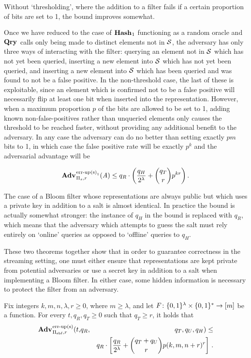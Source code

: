 Without `thresholding', where the addition to a filter fails if a certain proportion of bits are set to 1, the bound improves somewhat.

Once we have reduced to the case of $\mathbf{Hash}\hspace{0.5pt}_1$ functioning as a random oracle and $\mathbf{Qry}\hspace{0.5pt}$ calls only being made to distinct elements not in $\mathcal{S}$, the adversary has only three ways of interacting with the filter: querying an element not in $\mathcal{S}$ which has not yet been queried, inserting a new element into $\mathcal{S}$ which has not yet been queried, and inserting a new element into $\mathcal{S}$ which has been queried and was found to not be a false positive. In the non-threshold case, the last of these is exploitable, since an element which is confirmed not to be a false positive will necessarily flip at least one bit when inserted into the representation. However, when a maximum proportion $p$ of the bits are allowed to be set to 1, adding known non-false-positives rather than unqueried elements only causes the threshold to be reached faster, without providing any additional benefit to the adversary. In any case the adversary can do no better than setting exactly $pm$ bits to 1, in which case the false positive rate will be exactly $p^k$ and the adversarial advantage will be

$$\Adv{\erreps_1}_{\struct_s,r}(\advA) \le q_R \cdot \left(\frac{q_H}{2^\lambda} + \binom{q_T}{r}p^{kr}\right).$$

The case of a Bloom filter whose representations are always public but which uses a private key in addition to a salt is almost identical. In practice the bound is actually somewhat stronger: the instance of $q_H$ in the bound is replaced with $q_R$, which means that the adversary which attempts to guess the salt must rely entirely on `online' queries as opposed to `offline' queries to $q_H$.

These two theorems together show that in order to guarantee correctness in the streaming setting, one must either ensure that representations are kept private from potential adversaries or use a secret key in addition to a salt when implementing a Bloom filter. In either case, some hidden information is necessary to protect the filter from an adversary.

\begin{theorem}\label{thm:bf-key-bound}
Fix integers $k, m, n, \lambda, r\geq 0$, where $m \geq \lambda$, and let $F \colon \{0,1\}^\lambda \times \{0,1\}^* \to [m]$ be a function.
  For every $t, q_R, q_T \geq 0$ such that $q_T \geq r$, it holds that
  \begin{eqnarray*}
    \Adv{\erreps}_{\struct_\saltybloom,r}(t,&q_R,& q_T, q_U, q_H) \leq \\ && q_R \cdot
     \left[
      \frac{q_R}{2^\lambda} +
      {\dbinom{q_T+q_U}{r}} p(k, m, n+r)^r
    \right] \,.
  \end{eqnarray*}
\end{theorem}

